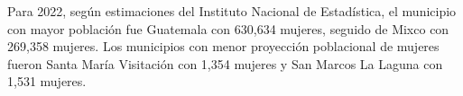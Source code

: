 Para 2022, según estimaciones del Instituto Nacional de Estadística, el municipio con mayor población fue Guatemala con 630,634 mujeres, seguido de Mixco con 269,358 mujeres. Los municipios con menor proyección poblacional de mujeres fueron Santa María Visitación con 1,354 mujeres y San Marcos La Laguna con 1,531 mujeres.  